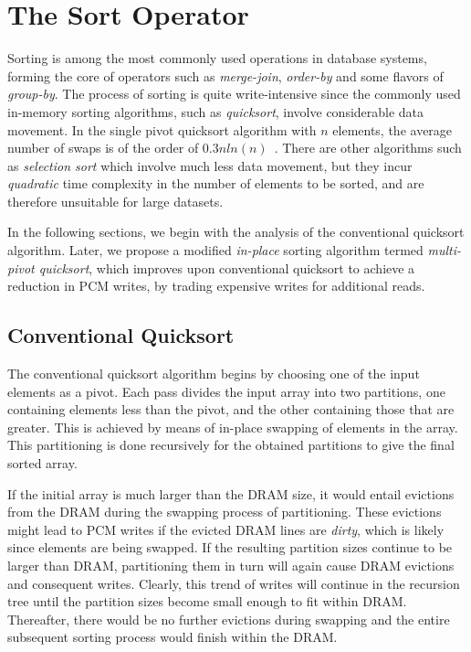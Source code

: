 \section{The Sort Operator}
\label{sort}

Sorting is among the most commonly used operations in database systems,
forming the core of operators such as \emph{merge-join}, \emph{order-by} and
some flavors of \emph{group-by}.  The process of sorting is quite
write-intensive since the commonly used in-memory sorting algorithms,
such as \textit{quicksort}, involve considerable data movement. In the
single pivot quicksort algorithm with $n$ elements, the average number
of swaps is of the order of $0.3nln(n)$~\cite{swaps}. There are other
algorithms such as \emph{selection sort} which involve much less data
movement, but they incur \emph{quadratic} time complexity in the number
of elements to be sorted, and are therefore unsuitable for large datasets.

In the following sections, we begin with the analysis of the conventional
quicksort algorithm. Later, we propose a modified \emph{in-place} sorting algorithm termed
\emph{multi-pivot quicksort}, which improves upon conventional quicksort
to achieve a reduction in PCM writes, by trading expensive writes for 
additional reads.

\subsection{Conventional Quicksort}
The conventional quicksort algorithm begins by choosing one of the
input elements as a pivot. Each pass divides the input array into two
partitions, one containing elements less than the pivot, and the other
containing those that are greater. This is achieved by means of in-place
swapping of elements in the array. This partitioning is done recursively
for the obtained partitions to give the final sorted array.

If the initial array is much larger than the DRAM size, it would
entail evictions from the DRAM during the swapping process of
partitioning. These evictions might lead to PCM writes if the evicted
DRAM lines are \textit{dirty}, which is likely since elements are being
swapped. If the resulting partition sizes continue to be larger than
DRAM, partitioning them in turn will again cause DRAM evictions and
consequent writes. Clearly, this trend of writes will continue in the
recursion tree until the partition sizes become small enough to fit within
DRAM. Thereafter, there would be no further evictions during swapping
and the entire subsequent sorting process would finish within the DRAM.

